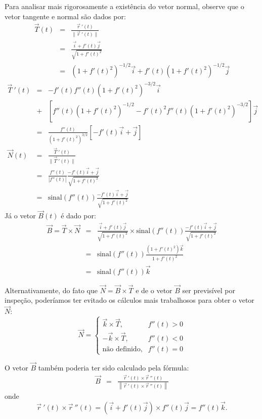 \begin{resol}
Para analisar mais rigorosamente a existência do vetor normal, observe que o vetor tangente e normal são dados por:
\begin{eqnarray*}
 \vec{T}(t)&=&\frac{\vec{r}~\!'(t)}{\|\vec{r}~\!'(t)\|}\\
 &=&\frac{\vec{i}+f'(t)\vec{j}}{\sqrt{1+f'(t)^2}}\\
 &=&\left(1+f'(t)^2\right)^{-1/2}\vec{i}+f'(t)\left(1+f'(t)^2\right)^{-1/2}\vec{j}
\end{eqnarray*}
\begin{eqnarray*}
 \vec{T}~\!'(t)
 &=&-f'(t)f''(t)\left(1+f'(t)^2\right)^{-3/2}\vec{i}\\
 &+&\left[f''(t)\left(1+f'(t)^2\right)^{-1/2}-f'(t)^2f''(t)\left(1+f'(t)^2\right)^{-3/2}\right]\vec{j}\\
 &=&\frac{f''(t)}{\left(1+f'(t)^2\right)^{3/2}}\left[-f'(t)\vec{i}+\vec{j}\right]\\
\vec{N}(t)&=&\frac{\vec{T}~\!'(t)}{\|\vec{T}~\!'(t)\|}\\
&=&\frac{f''(t)}{|f''(t)|}\frac{-f'(t)\vec{i}+\vec{j}}{\sqrt{1+f'(t)^2}}\\
&=&\text{sinal}\left(f''(t)\right)\frac{-f'(t)\vec{i}+\vec{j}}{\sqrt{1+f'(t)^2}}
\end{eqnarray*}
Já o vetor $\vec{B}(t)$ é dado por:
\begin{eqnarray*}
\vec{B}=\vec{T}\times \vec{N} &=& \frac{\vec{i}+f'(t)\vec{j}}{\sqrt{1+f'(t)^2}} \times \text{sinal}\left(f''(t)\right)\frac{-f'(t)\vec{i}+\vec{j}}{\sqrt{1+f'(t)^2}}\\
&=&\text{sinal}(f''(t))\frac{(1+f'(t)^2)\vec{k}}{1+f'(t)^2}\\
&=&\text{sinal}(f''(t))\vec{k}
\end{eqnarray*}

Alternativamente, do fato que $\vec{N}=\vec{B}\times \vec{T}$ e de o vetor $\vec{B}$ ser previsível por inspeção, poderíamos ter evitado os cálculos mais trabalhosos para obter o vetor $\vec{N}$:
$$\vec{N}=\left\{
\begin{array}{rr}
\vec{k}\times\vec{T},&f''(t)>0\\
-\vec{k}\times\vec{T},&f''(t)<0\\
\text{não definido},&f''(t)=0
\end{array}
\right.$$

O vetor $\vec{B}$ também poderia ter sido calculado pela fórmula:
 \begin{eqnarray*}
  \vec{B}&=&\frac{\vec{r}~\!'(t)\times \vec{r}~\!''(t)}{\left\|\vec{r}~\!'(t)\times \vec{r}~\!''(t)\right\|}
 \end{eqnarray*}
onde $$\vec{r}~\!'(t)\times \vec{r}~\!''(t)=\left(\vec{i}+f'(t)\vec{j}\right)\times f''(t)\vec{j}=f''(t)\vec{k}.$$
\end{resol}

